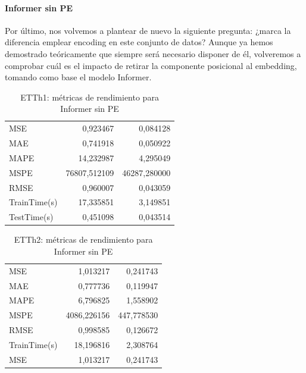  \paragraph{Informer sin PE}
 
 Por último, nos volvemos a plantear de nuevo la siguiente pregunta: ¿marca la diferencia emplear encoding en este conjunto de datos? Aunque ya hemos demostrado teóricamente que siempre será necesario disponer de él, volveremos a comprobar cuál es el impacto de retirar la componente posicional al embedding, tomando como base el modelo Informer.\\
 
  \begin{table}[!ht]
 	\centering
 	\begin{tabular}{l|N|N}
 		\toprule
 		 &  &  \\
 		\midrule
 		MSE & 0,923467 & 0,084128 \\
		MAE & 0,741918 & 0,050922 \\
		MAPE & 14,232987 & 4,295049 \\
		MSPE & 76807,512109 & 46287,280000 \\
		RMSE & 0,960007 & 0,043059 \\
		TrainTime(s) & 17,335851 & 3,149851 \\
		TestTime(s) & 0,451098 & 0,043514 \\
 		\bottomrule
 	\end{tabular}
 	\caption{ETTh1: métricas de rendimiento para Informer sin PE}
 	\label{etth1nope}
 \end{table}
 
 
 
   \begin{table}[!ht]
 	\centering
 	\begin{tabular}{l|N|N}
 		\toprule
 		 &  &  \\
 		\midrule
 	 	MSE & 1,013217 & 0,241743 \\
 		MAE & 0,777736 & 0,119947 \\
 		MAPE & 6,796825 & 1,558902 \\
 		MSPE & 4086,226156 & 447,778530 \\
 		RMSE & 0,998585 & 0,126672 \\
 		TrainTime(s) & 18,196816 & 2,308764 \\
 	 	MSE & 1,013217 & 0,241743 \\
 		\bottomrule
 	\end{tabular}
 	\caption{ETTh2: métricas de rendimiento para Informer sin PE}
 	\label{etth2nope}
 \end{table}

